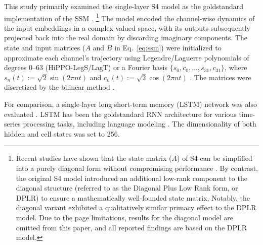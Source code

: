 \documentclass[10pt,letterpaper]{article}
\begin{document}
This study primarily examined the single-layer S4 model as the goldstandard implementation of the SSM \citep{Gu+22}.%
\footnote{
	Recent studies have shown that the state matrix ($A$) of S4 can be simplified into a purely diagonal form without compromising performance \citep[S4D;][]{Gu+22_S4D}.
	By contrast, the original S4 model introduced an additional low-rank component to the diagonal structure (referred to as the Diagonal Plus Low Rank form, or DPLR) to ensure a mathematically well-founded state matrix.
	Notably, the diagonal variant exhibited a qualitatively similar primacy effect to the DPLR model.
	Due to the page limitations, results for the diagonal model are omitted from this paper, and all reported findings are based on the DPLR model.}
The model encoded the channel-wise dynamics of the input embeddings in a complex-valued space, with its outputs subsequently projected back into the real domain by discarding imaginary components.
The state and input matrices ($A$ and $B$ in Eq.~\ref{eq:ssm}) were initialized to approximate each channel's trajectory using Legendre/Laguerre polynomials of degrees 0--63 (HiPPO-LegS/LagT)
or a Fourier basis $\{ s_0,c_0,\dots,s_{31},c_{31} \}$, where $s_n(t) := \sqrt{2}\sin(2\pi n t)$ and $c_n(t) := \sqrt{2}\cos(2\pi n t)$ \citep[HiPPO-Fout, Fourier Recurrent Unit;][]{Zhang+18_FRU,Gu+20,Gu+23_ICLR}.
The matrices were discretized by the bilinear method \citep{Tustin47}.

For comparison, a single-layer long short-term memory (LSTM) network was also evaluated \citep[][]{HochreiterSchmidhuber97_LSTM}.
LSTM
has been the goldstandard RNN architecture for various time-series processing tasks, including language modeling \citep{Sundermeyer+12,Graves13}.
The dimensionality of both hidden and cell states was set to 256.
\end{document}
